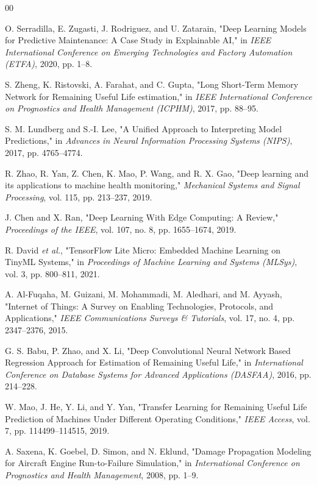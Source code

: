 \documentclass[journal]{IEEEtran}
\begin{document}
\begin{thebibliography}{00}

 O. Serradilla, E. Zugasti, J. Rodriguez, and U. Zatarain, "Deep Learning Models for Predictive Maintenance: A Case Study in Explainable AI," in \textit{IEEE International Conference on Emerging Technologies and Factory Automation (ETFA)}, 2020, pp. 1--8.

 S. Zheng, K. Ristovski, A. Farahat, and C. Gupta, "Long Short-Term Memory Network for Remaining Useful Life estimation," in \textit{IEEE International Conference on Prognostics and Health Management (ICPHM)}, 2017, pp. 88--95.

 S. M. Lundberg and S.-I. Lee, "A Unified Approach to Interpreting Model Predictions," in \textit{Advances in Neural Information Processing Systems (NIPS)}, 2017, pp. 4765--4774.

 R. Zhao, R. Yan, Z. Chen, K. Mao, P. Wang, and R. X. Gao, "Deep learning and its applications to machine health monitoring," \textit{Mechanical Systems and Signal Processing}, vol. 115, pp. 213--237, 2019.

 J. Chen and X. Ran, "Deep Learning With Edge Computing: A Review," \textit{Proceedings of the IEEE}, vol. 107, no. 8, pp. 1655--1674, 2019.

 R. David \textit{et al.}, "TensorFlow Lite Micro: Embedded Machine Learning on TinyML Systems," in \textit{Proceedings of Machine Learning and Systems (MLSys)}, vol. 3, pp. 800--811, 2021.

 A. Al-Fuqaha, M. Guizani, M. Mohammadi, M. Aledhari, and M. Ayyash, "Internet of Things: A Survey on Enabling Technologies, Protocols, and Applications," \textit{IEEE Communications Surveys \& Tutorials}, vol. 17, no. 4, pp. 2347--2376, 2015.

 G. S. Babu, P. Zhao, and X. Li, "Deep Convolutional Neural Network Based Regression Approach for Estimation of Remaining Useful Life," in \textit{International Conference on Database Systems for Advanced Applications (DASFAA)}, 2016, pp. 214--228.


 W. Mao, J. He, Y. Li, and Y. Yan, "Transfer Learning for Remaining Useful Life Prediction of Machines Under Different Operating Conditions," \textit{IEEE Access}, vol. 7, pp. 114499--114515, 2019.

 A. Saxena, K. Goebel, D. Simon, and N. Eklund, "Damage Propagation Modeling for Aircraft Engine Run-to-Failure Simulation," in \textit{International Conference on Prognostics and Health Management}, 2008, pp. 1--9.



\end{thebibliography}
\end{document}
